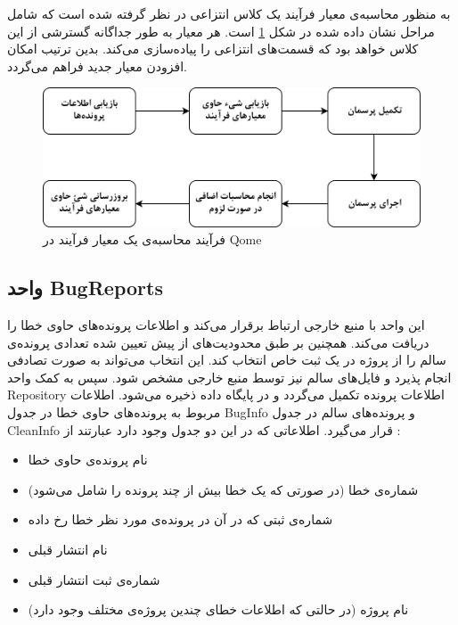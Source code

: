 به منظور محاسبه‌ی معیار فرآیند یک کلاس انتزاعی در نظر گرفته شده است که شامل مراحل نشان داده شده در شکل \ref{fig:process-chart}  است. هر معیار به طور جداگانه گسترشی از این کلاس خواهد بود که  قسمت‌های انتزاعی را پیاده‌سازی می‌کند. بدین ترتیب امکان افزودن معیار جدید فراهم می‌گردد. 
\begin{figure}[H]
	\centering
	\includegraphics[width=.8\textwidth]{img/method/process-chart.png}
	\caption{ فرآیند محاسبه‌ی یک معیار فرآیند در Qome}
	\label{fig:process-chart}
\end{figure}


\subsection{واحد BugReports  }
این واحد با منبع خارجی ارتباط برقرار می‌کند و اطلاعات پرونده‌های حاوی خطا را دریافت می‌کند. همچنین بر طبق محدودیت‌های از پیش تعیین شده تعدادی پرونده‌ی سالم را از پروژه در یک ثبت خاص انتخاب کند. این انتخاب می‌تواند به صورت تصادفی انجام پذیرد و فایل‌های سالم نیز توسط منبع خارجی مشخص شود. سپس به کمک واحد Repository اطلاعات پرونده تکمیل می‌گردد و در پایگاه داده ذخیره می‌شود. اطلاعات مربوط به پرونده‌های حاوی خطا در جدول BugInfo و پرونده‌های سالم در جدول CleanInfo  قرار می‌گیرد. اطلاعاتی که در این دو جدول وجود دارد عبارتند از :
\begin{itemize}
	\item 
	نام پرونده‌ی حاوی خطا
	\item
	شماره‌ی خطا (در صورتی که یک خطا بیش از چند پرونده را شامل می‌شود)
	\item
	شماره‌ی ثبتی که در آن در پرونده‌ی مورد نظر خطا رخ داده
	\item
	نام انتشار قبلی
	\item
	شماره‌ی ثبت انتشار قبلی
	\item 
	نام پروژه (در حالتی که اطلاعات خطای چندین پروژه‌ی مختلف وجود دارد)
\end{itemize}

